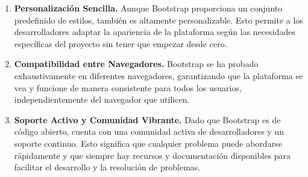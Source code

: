 \documentclass{article}
\begin{document}
\begin{itemize}
\begin{enumerate}
                    \item \textbf{Personalización Sencilla.} Aunque Bootstrap proporciona un conjunto predefinido de estilos, también es altamente personalizable. Esto permite a los desarrolladores adaptar la apariencia de la plataforma según las necesidades específicas del proyecto sin tener que empezar desde cero.

                    \item \textbf{Compatibilidad entre Navegadores.} Bootstrap se ha probado exhaustivamente en diferentes navegadores, garantizando que la plataforma se vea y funcione de manera consistente para todos los usuarios, independientemente del navegador que utilicen.

                    \item \textbf{Soporte Activo y Comunidad Vibrante.} Dado que Bootstrap es de código abierto, cuenta con una comunidad activa de desarrolladores y un soporte continuo. Esto significa que cualquier problema puede abordarse rápidamente y que siempre hay recursos y documentación disponibles para facilitar el desarrollo y la resolución de problemas.
                \end{enumerate}
            \end{itemize}
\end{document}
